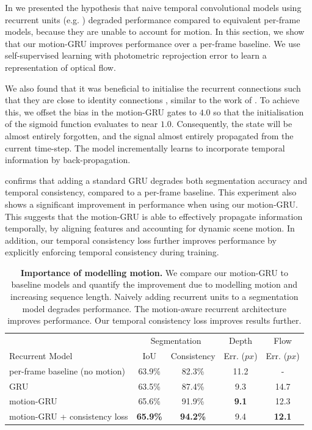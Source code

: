 In  we presented the hypothesis that naive temporal convolutional models using recurrent units (e.g. \citep{patraucean2015spatio,valipour2017recurrent}) degraded performance compared to equivalent per-frame models, because they are unable to account for motion. In this section, we show that our motion-GRU improves performance over a per-frame baseline. We use self-supervised learning with photometric reprojection error to learn a representation of optical flow.

We also found that it was beneficial to initialise the recurrent connections such that they are close to identity connections \citep{he2016deep}, similar to the work of \citep{gadde2017semantic}. To achieve this, we offset the bias in the motion-GRU gates to $4.0$ so that the initialisation of the sigmoid function evaluates to near $1.0$. Consequently, the state will be almost entirely forgotten, and the signal almost entirely propagated from the current time-step. The model incrementally learns to incorporate temporal information by back-propagation.

 confirms that adding a standard GRU degrades both segmentation accuracy and temporal consistency, compared to a per-frame baseline. This experiment also shows a significant improvement in performance when using our motion-GRU. This suggests that the motion-GRU is able to effectively propagate information temporally, by aligning features and accounting for dynamic scene motion.
In addition, our temporal consistency loss further improves performance by explicitly enforcing temporal consistency during training.

\begin{table}[t]
\begin{center}
	\begin{tabular}{l|c|c|c|c}
    \hline
    & \multicolumn{2}{c|}{Segmentation} & Depth & Flow \\
    Recurrent Model & IoU & Consistency & Err. ($px$) & Err. ($px$) \\
    \hline\hline
    per-frame baseline (no motion) & 63.9\% & 82.3\% & 11.2 & - \\
    GRU & 63.5\% & 87.4\% & 9.3 & 14.7 \\
    motion-GRU & 65.6\% & 91.9\% & \textbf{9.1} & 12.3 \\
    motion-GRU + consistency loss & \textbf{65.9\%} & \textbf{94.2\%} & 9.4 & \textbf{12.1} \\
    \hline
	\end{tabular}
\end{center}
\vspace{-2mm}
\caption[Importance of modelling motion.]{\textbf{Importance of modelling motion.} We compare our motion-GRU to baseline models and quantify the improvement due to modelling motion and increasing sequence length. Naively adding recurrent units to a segmentation model degrades performance. The motion-aware recurrent architecture improves performance. Our temporal consistency loss improves results further.}
\label{tbl:motion}
\vspace{-5mm}
\end{table}

